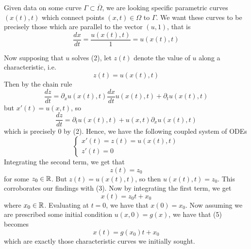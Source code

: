 \documentclass{myproject}
\begin{document}
Given data on some curve $ \Gamma \subset \overline{\Omega} $, we are looking specific parametric curves $ (x(t), t) $ which connect points $(x, t) \in \Omega$ to $ \Gamma $. We want these curves to be precisely those which are parallel to the vector $(u, 1)$, that is
\[
    \frac{dx}{dt} = \frac{u(x(t), t)}{1} = u(x(t), t)
\]

Now supposing that $u$ solves (2), let $z(t)$ denote the value of $u$ along a characteristic, i.e. 
\[
    z(t) = u(x(t), t)
\]
Then by the chain rule
\[
    \frac{dz}{dt} = \partial_x u(x(t), t) \frac{dx}{dt}u(x(t), t) + \partial_t u(x(t), t)
\]
but $ x'(t) = u(x,t) $, so
\[
    \frac{dz}{dt} = \partial_t u(x(t), t) + u(x,t)\partial_x u(x(t), t)
\]
which is precisely 0 by (2). Hence, we have the following coupled system of ODEs
\begin{equation}
    \begin{cases}
        x'(t) = z(t) = u(x(t), t) \\
        z'(t) = 0
    \end{cases}
\end{equation}
Integrating the second term, we get that
\[
    z(t) = z_0
\]
for some $ z_0 \in \operatorname{\mathbb{R}} $. But $z(t) = u(x(t), t)$, so then $u(x(t), t) = z_0$. This corroborates our findings with (3). Now by integrating the first term, we get
\begin{equation}
    x(t) = z_0t + x_0
\end{equation}
where $ x_0 \in \operatorname{\mathbb{R}} $. Evaluating at $t=0$, we have that $x(0) = x_0$. Now assuming we are prescribed some initial condition $u(x,0) = g(x)$, we have that (5) becomes
\begin{equation}
    x(t) = g(x_0)t + x_0
\end{equation}
which are exactly those characteristic curves we initially sought.
\end{document}
